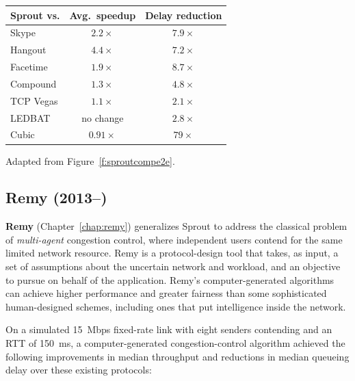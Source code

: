 \begin{center}
\noindent \begin{tabular}{|l|c|c|}
\hline
Sprout vs. & Avg.~speedup & Delay reduction \\
\hline
\hline
Skype & $2.2\times$ & $7.9\times$\\
Hangout & $4.4\times$ & $7.2\times$\\
Facetime & $1.9\times$ & $8.7\times$\\
\hline
Compound & $1.3\times$ & $4.8\times$\\
TCP Vegas & $1.1\times$ & $2.1\times$\\
LEDBAT & no change & $2.8\times$\\
Cubic & \cellcolor{red!20}$0.91\times$ & $79\times$\\
\hline
\end{tabular}

{\footnotesize Adapted from Figure~\ref{f:sproutcompe2e}.}

\end{center}

\subsection{Remy (2013--)}

\textbf{Remy} (Chapter~\ref{chap:remy}) generalizes Sprout to address
the classical problem of \emph{multi-agent} congestion control, where
independent users contend for the same limited network resource. Remy
is a protocol-design tool that takes, as input, a set of assumptions
about the uncertain network and workload, and an objective to pursue
on behalf of the application. Remy's computer-generated algorithms can
achieve higher performance and greater fairness than some
sophisticated human-designed schemes, including ones that put
intelligence inside the network.

On a simulated 15~Mbps fixed-rate link with eight senders contending and
an RTT of 150~ms, a computer-generated congestion-control algorithm
achieved the following improvements in median throughput and
reductions in median queueing delay over these existing protocols:

